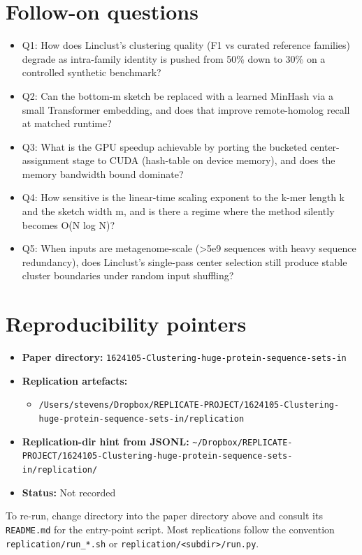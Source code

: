 \documentclass[11pt]{article}
\begin{document}
\section{Follow-on questions}
\begin{itemize}
\item Q1: How does Linclust's clustering quality (F1 vs curated reference families) degrade as intra-family identity is pushed from 50\% down to 30\% on a controlled synthetic benchmark?
\item Q2: Can the bottom-m sketch be replaced with a learned MinHash via a small Transformer embedding, and does that improve remote-homolog recall at matched runtime?
\item Q3: What is the GPU speedup achievable by porting the bucketed center-assignment stage to CUDA (hash-table on device memory), and does the memory bandwidth bound dominate?
\item Q4: How sensitive is the linear-time scaling exponent to the k-mer length k and the sketch width m, and is there a regime where the method silently becomes O(N log N)?
\item Q5: When inputs are metagenome-scale (\textgreater{}5e9 sequences with heavy sequence redundancy), does Linclust's single-pass center selection still produce stable cluster boundaries under random input shuffling?
\end{itemize}

\section{Reproducibility pointers}\label{sec:repro}
\begin{itemize}
\item \textbf{Paper directory:} \texttt{1624105-Clustering-huge-protein-sequence-sets-in}
\item \textbf{Replication artefacts:}
\begin{itemize}
\item \texttt{/Users/stevens/Dropbox/REPLICATE-PROJECT/1624105-Clustering-huge-protein-sequence-sets-in/replication}
\end{itemize}
\item \textbf{Replication-dir hint from JSONL:} \texttt{\textasciitilde{}/Dropbox/REPLICATE-PROJECT/1624105-Clustering-huge-protein-sequence-sets-in/replication/}
\item \textbf{Status:} Not recorded
\end{itemize}

To re-run, change directory into the paper directory above and consult its \texttt{README.md} for the entry-point script. Most replications follow the convention \texttt{replication/run\_*.sh} or \texttt{replication/<subdir>/run.py}.
\end{document}
